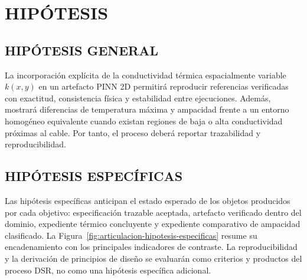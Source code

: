 \documentclass[11pt,a4paper,oneside]{report}
\newcommand{\kx}{k(x,y)}
\begin{document}
\section{HIPÓTESIS}

\subsection{HIPÓTESIS GENERAL}

La incorporación explícita de la conductividad térmica espacialmente variable $\kx$ en un artefacto PINN 2D permitirá reproducir referencias verificadas con exactitud, consistencia física y estabilidad entre ejecuciones. Además, mostrará diferencias de temperatura máxima y ampacidad frente a un entorno homogéneo equivalente cuando existan regiones de baja o alta conductividad próximas al cable. Por tanto, el proceso deberá reportar trazabilidad y reproducibilidad.

\subsection{HIPÓTESIS ESPECÍFICAS}

Las hipótesis específicas anticipan el estado esperado de los objetos producidos por cada objetivo: especificación trazable aceptada, artefacto verificado dentro del dominio, expediente térmico concluyente y expediente comparativo de ampacidad clasificado. La Figura~\ref{fig:articulacion-hipotesis-especificas} resume su encadenamiento con los principales indicadores de contraste. La reproducibilidad y la derivación de principios de diseño se evaluarán como criterios y productos del proceso DSR, no como una hipótesis específica adicional.
\end{document}
